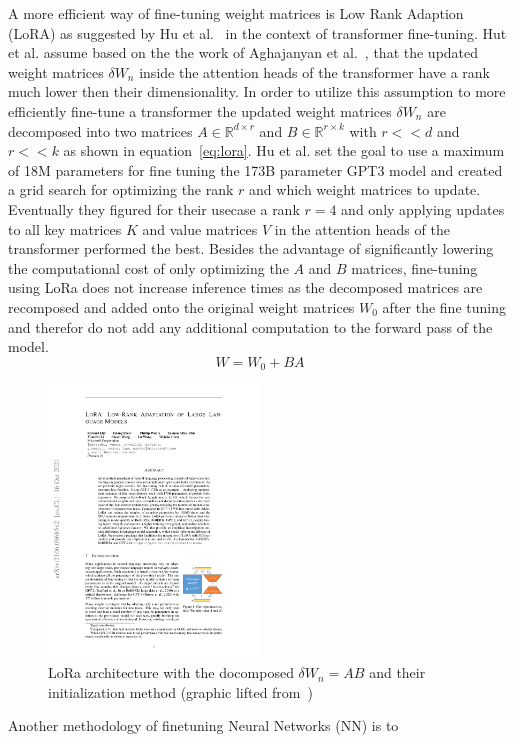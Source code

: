 A more efficient way of fine-tuning weight matrices is Low Rank Adaption (LoRA) as suggested by Hu et al.~\cite{Hu2021} in the context of transformer fine-tuning.
Hut et al. assume based on the the work of Aghajanyan et al.~\cite{Aghajanyan2020}, that the updated weight matrices $\delta W_n$ inside the attention heads of the transformer have a rank much lower then their dimensionality.
In order to utilize this assumption to more efficiently fine-tune a transformer the updated weight matrices $\delta W_n$ are decomposed into two matrices $A \in \mathbb{R}^{d \times r}$ and $B \in \mathbb{R}^{r \times k}$ with $r << d$ and $r << k$ as shown in equation~\ref{eq:lora}.
Hu et al. set the goal to use a maximum of 18M parameters for fine tuning the 173B parameter GPT3 model and created a grid search for optimizing the rank $r$ and which weight matrices to update.
Eventually they figured for their usecase a rank $r = 4$ and only applying updates to all key matrices $K$ and value matrices $V$ in the attention heads of the transformer performed the best.
Besides the advantage of significantly lowering the computational cost of only optimizing the $A$ and $B$ matrices, fine-tuning using LoRa does not increase inference times as the decomposed matrices are recomposed and added onto the original weight matrices $W_0$ after the fine tuning and therefor do not add any additional computation to the forward pass of the model.
\begin{equation}
    W = W_0 + BA
    \label{eq:lora}
\end{equation}

\begin{figure}
    \centering
    \includegraphics[width=0.5\textwidth]{images/Hu2021_LoraArch.pdf}
    \caption{LoRa architecture with the docomposed $\delta W_n = AB$ and their initialization  method (graphic lifted from~\cite{Hu2021})}\label{fig:loraarch}
\end{figure}

Another methodology of finetuning Neural Networks (NN) is to 